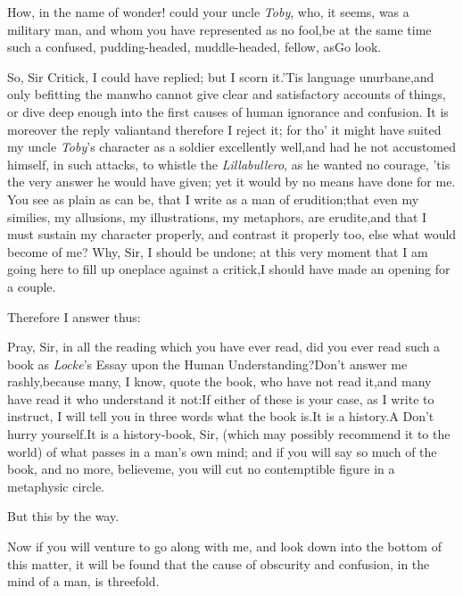 \documentclass{article}
\begin{document}
\tsh How, in the name of wonder! could your
uncle \textit{Toby}, who, it seems, was a military man, and whom you
have represented as no fool,\tsk be at the same time such a
confused, pudding-headed, muddle-headed, fellow, as\tsk Go
look.

So, Sir Critick, I could have replied; but I scorn it.\tsh ’Tis
language un\-urbane,\tsk and only befitting the man\pb who
cannot give clear and satisfactory accounts of things, or dive
deep enough into the first causes of human ignorance and
confusion. It is moreover the reply valiant\tsk and therefore I
reject it; for tho’ it might have suited my uncle
\textit{Toby}’s character as a soldier excellently well,\tsk and
had he not accustomed himself, in such attacks, to whistle the
\textit{Lilla\-bullero}, as he wanted no courage, ’tis the very
answer he would have given; yet it would by no means have done
for me. You see as plain as can be, that I write as a man of
erudition;\tsk that even my similies, my allusions, my
illustrations, my metaphors, are erudite,\tsk and that I must
sustain my character properly, and contrast it properly too,\tsk
else what would become of me? Why, Sir, I should be undone;\tsk
at this very moment that I am going here to fill up one\pb place
against a critick,\tsk I should have made an opening for a
couple.

\tsh Therefore I answer thus:

Pray, Sir, in all the reading which you have ever read, did you
ever read such a book as \textit{Locke}’s Essay upon the Human
Understanding?\tsh Don’t answer me rashly,\tsk because many, I
know, quote the book, who have not read it,\tsk and many have
read it who understand it not:\tsk If either of these is your
case, as I write to instruct, I will tell you in three words
what the book is.\tsk It is a history.\tsk A\break
{}
Don’t hurry yourself.\tsk It is a
history-book, Sir, (which may possibly recommend it to the
world) of what passes in a man’s own mind; and if you will say
so much of the book, and no more, believe\pb me, you will cut no
contemptible figure in a metaphysic circle.

But this by the way.

Now if you will venture to go along with me, and look down into
the bottom of this matter, it will be found that the cause of
obscurity and confusion, in the mind of a man, is threefold.
\end{document}

